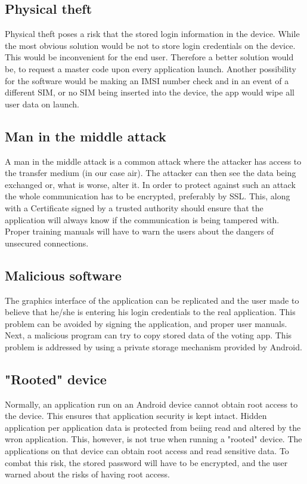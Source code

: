 \documentclass[11pt,twoside,a4paper]{book}
\begin{document}
\subsection{Physical theft}
Physical theft poses a risk that the stored login information in the device. While the most obvious solution would be not to store login credentials on the device. This would be inconvenient for the end user. Therefore a better solution would be, to request a master code upon every application launch. Another possibility for the software would be making an IMSI number check and in an event of a different SIM, or no SIM being inserted into the device, the app would wipe all user data on launch. 
\subsection{Man in the middle attack}
A man in the middle attack is a common attack where the attacker has access to the transfer medium (in our case air). The attacker can then see the data being exchanged or, what is worse, alter it. In order to protect against such an attack the whole communication has to be encrypted, preferably by SSL. This, along with a Certificate signed by a trusted authority should ensure that the application will always know if the communication is being tampered with. Proper training manuals will have to warn the users about the dangers of unsecured connections.
\subsection{Malicious software}
The graphics interface of the application can be replicated and the user made to believe that he/she is entering his login credentials to the real application. This problem can be avoided by signing the application, and proper user manuals.\\
Next, a malicious program can try to copy stored data of the voting app. This problem is addressed by using a private storage mechanism provided by Android. \cite{storageAnd}

\subsection{"Rooted" device}
Normally, an application run on an Android device cannot obtain root access to the device. This ensures that application security is kept intact. Hidden application per application data is protected from beiing read and altered by the wron application. This, however, is not true when running a "rooted" device. The applications on that device can obtain root access and read sensitive data. To combat this risk, the stored password will have to be encrypted, and the user warned about the risks of having root access.
\end{document}
